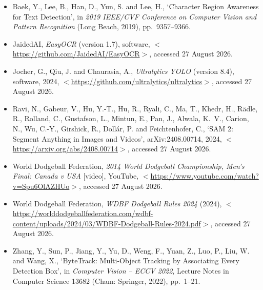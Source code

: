\documentclass[10pt,a4paper]{article}
\begin{document}
\raggedright\sloppy
\begin{itemize}[leftmargin=1.4em,label={},itemsep=4pt]
\item Baek, Y., Lee, B., Han, D., Yun, S. and Lee, H., `Character Region Awareness for
Text Detection', in \emph{2019 IEEE/CVF Conference on Computer Vision and Pattern
Recognition} (Long Beach, 2019), pp.\ 9357--9366.
\item JaidedAI, \emph{EasyOCR} (version 1.7), software,
$<$\url{https://github.com/JaidedAI/EasyOCR}$>$, accessed 27 August 2026.
\item Jocher, G., Qiu, J. and Chaurasia, A., \emph{Ultralytics YOLO} (version 8.4),
software, 2024, $<$\url{https://github.com/ultralytics/ultralytics}$>$, accessed
27 August 2026.
\item Ravi, N., Gabeur, V., Hu, Y.-T., Hu, R., Ryali, C., Ma, T., Khedr, H., R\"adle, R.,
Rolland, C., Gustafson, L., Mintun, E., Pan, J., Alwala, K.\ V., Carion, N., Wu, C.-Y.,
Girshick, R., Doll\'ar, P. and Feichtenhofer, C., `SAM 2: Segment Anything in Images and
Videos', arXiv:2408.00714, 2024, $<$\url{https://arxiv.org/abs/2408.00714}$>$, accessed
27 August 2026.
\item World Dodgeball Federation, \emph{2014 World Dodgeball Championship, Men's Final:
Canada v USA} [video], YouTube, $<$\url{https://www.youtube.com/watch?v=Spu6OlAZHUo}$>$,
accessed 27 August 2026.
\item World Dodgeball Federation, \emph{WDBF Dodgeball Rules 2024} (2024),
$<$\url{https://worlddodgeballfederation.com/wdbf-content/uploads/2024/03/WDBF-Dodgeball-Rules-2024.pdf}$>$,
accessed 27 August 2026.
\item Zhang, Y., Sun, P., Jiang, Y., Yu, D., Weng, F., Yuan, Z., Luo, P., Liu, W. and
Wang, X., `ByteTrack: Multi-Object Tracking by Associating Every Detection Box', in
\emph{Computer Vision -- ECCV 2022}, Lecture Notes in Computer Science 13682 (Cham:
Springer, 2022), pp.\ 1--21.
\end{itemize}
\end{document}
